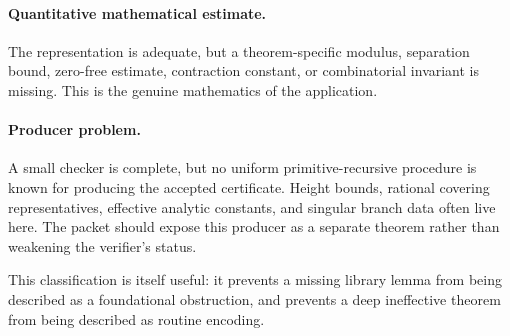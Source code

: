 \paragraph{Quantitative mathematical estimate.}
The representation is adequate, but a theorem-specific modulus, separation
bound, zero-free estimate, contraction constant, or combinatorial invariant is
missing.  This is the genuine mathematics of the application.

\paragraph{Producer problem.}
A small checker is complete, but no uniform primitive-recursive procedure is
known for producing the accepted certificate.  Height bounds, rational
covering representatives, effective analytic constants, and singular branch
data often live here.  The packet should expose this producer as a separate
theorem rather than weakening the verifier's status.

This classification is itself useful: it prevents a missing library lemma
from being described as a foundational obstruction, and prevents a deep
ineffective theorem from being described as routine encoding.
